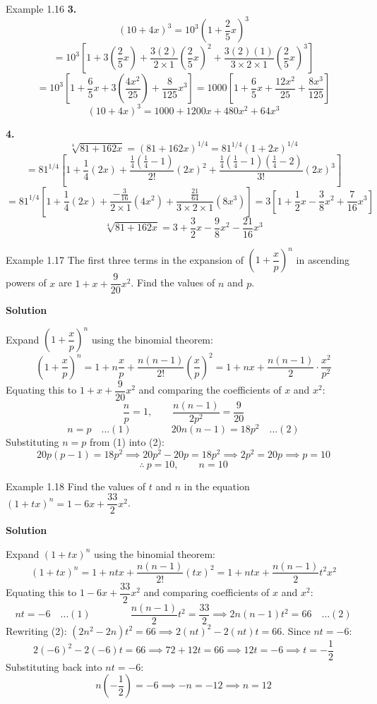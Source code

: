\begin{example}{Example 1.16}
\textbf{3.}
\[
  (10+4x)^3 = 10^3\left(1+\frac{2}{5}x\right)^3
\]
\[
  = 10^3\left[1 + 3\left(\frac{2}{5}x\right) + \frac{3(2)}{2\times1}\left(\frac{2}{5}x\right)^2 + \frac{3(2)(1)}{3\times2\times1}\left(\frac{2}{5}x\right)^3\right]
\]
\[
  = 10^3\left[1 + \frac{6}{5}x + 3\left(\frac{4x^2}{25}\right) + \frac{8}{125}x^3\right]
  = 1000\left[1 + \frac{6}{5}x + \frac{12x^2}{25} + \frac{8x^3}{125}\right]
\]
\[
  (10+4x)^3 = 1000 + 1200x + 480x^2 + 64x^3
\]

\textbf{4.}
\[
  \sqrt[4]{81+162x} = (81+162x)^{1/4} = 81^{1/4}(1+2x)^{1/4}
\]
\[
  = 81^{1/4}\left[1 + \frac{1}{4}(2x) + \frac{\tfrac{1}{4}\left(\tfrac{1}{4}-1\right)}{2!}(2x)^2 + \frac{\tfrac{1}{4}\left(\tfrac{1}{4}-1\right)\left(\tfrac{1}{4}-2\right)}{3!}(2x)^3\right]
\]
\[
  = 81^{1/4}\left[1 + \frac{1}{4}(2x) + \frac{-\tfrac{3}{16}}{2\times1}(4x^2) + \frac{\tfrac{21}{64}}{3\times2\times1}(8x^3)\right]
  = 3\left[1 + \frac{1}{2}x - \frac{3}{8}x^2 + \frac{7}{16}x^3\right]
\]
\[
  \sqrt[4]{81+162x} = 3 + \frac{3}{2}x - \frac{9}{8}x^2 - \frac{21}{16}x^3
\]
\end{example}

\begin{example}{Example 1.17}
The first three terms in the expansion of $\left(1+\dfrac{x}{p}\right)^n$ in ascending powers
of $x$ are $1 + x + \dfrac{9}{20}x^2$. Find the values of $n$ and $p$.

\medskip\noindent\textbf{Solution}

Expand $\left(1+\dfrac{x}{p}\right)^n$ using the binomial theorem:
\[
  \left(1+\frac{x}{p}\right)^n = 1 + n\frac{x}{p} + \frac{n(n-1)}{2!}\left(\frac{x}{p}\right)^2 = 1 + nx + \frac{n(n-1)}{2}\cdot\frac{x^2}{p^2}
\]
Equating this to $1 + x + \dfrac{9}{20}x^2$ and comparing the coefficients of $x$ and $x^2$:
\[
  \frac{n}{p} = 1, \qquad \frac{n(n-1)}{2p^2} = \frac{9}{20}
\]
\[
  n = p \quad \ldots (1) \qquad\qquad 20n(n-1) = 18p^2 \quad \ldots (2)
\]
Substituting $n=p$ from (1) into (2):
\[
  20p(p-1) = 18p^2 \implies 20p^2 - 20p = 18p^2 \implies 2p^2 = 20p \implies p = 10
\]
\[
  \therefore\ p = 10, \qquad n = 10
\]
\end{example}

\begin{example}{Example 1.18}
Find the values of $t$ and $n$ in the equation $(1+tx)^n = 1 - 6x + \dfrac{33}{2}x^2$.

\medskip\noindent\textbf{Solution}

Expand $(1+tx)^n$ using the binomial theorem:
\[
  (1+tx)^n = 1 + ntx + \frac{n(n-1)}{2!}(tx)^2 = 1 + ntx + \frac{n(n-1)}{2}t^2x^2
\]
Equating this to $1 - 6x + \dfrac{33}{2}x^2$ and comparing coefficients of $x$ and $x^2$:
\[
  nt = -6 \quad \ldots (1) \qquad\qquad \frac{n(n-1)}{2}t^2 = \frac{33}{2} \implies 2n(n-1)t^2 = 66 \quad \ldots (2)
\]
Rewriting (2): $(2n^2-2n)t^2 = 66 \implies 2(nt)^2 - 2(nt)t = 66$.
Since $nt=-6$:
\[
  2(-6)^2 - 2(-6)t = 66 \implies 72 + 12t = 66 \implies 12t = -6 \implies t = -\frac{1}{2}
\]
Substituting back into $nt=-6$:
\[
  n\left(-\frac{1}{2}\right) = -6 \implies -n = -12 \implies n = 12
\]
\end{example}

